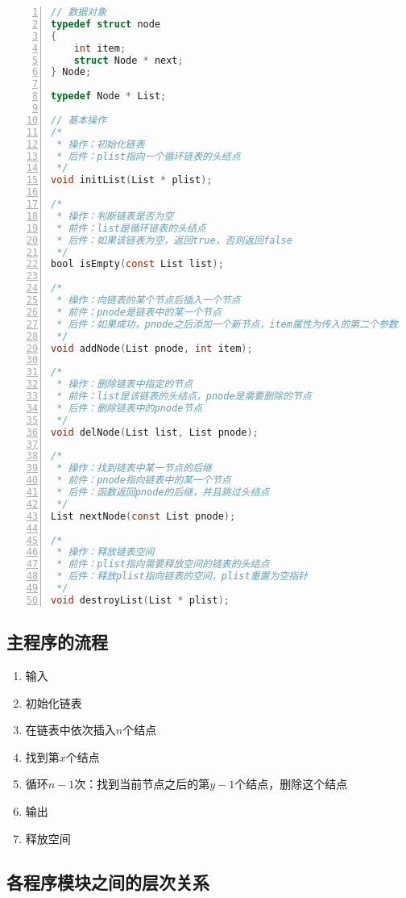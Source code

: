 \documentclass{article}
\begin{document}
\begin{lstlisting}[language={C},
    numbers=left,
    numberstyle=\tiny\menlo,
    basicstyle=\small\menlo]
// 数据对象
typedef struct node
{
    int item;
    struct Node * next;
} Node;

typedef Node * List;

// 基本操作
/*
 * 操作：初始化链表
 * 后件：plist指向一个循环链表的头结点
 */
void initList(List * plist);

/*
 * 操作：判断链表是否为空
 * 前件：list是循环链表的头结点
 * 后件：如果该链表为空，返回true，否则返回false
 */
bool isEmpty(const List list);

/*
 * 操作：向链表的某个节点后插入一个节点
 * 前件：pnode是链表中的某一个节点
 * 后件：如果成功，pnode之后添加一个新节点，item属性为传入的第二个参数
 */
void addNode(List pnode, int item);

/*
 * 操作：删除链表中指定的节点
 * 前件：list是该链表的头结点，pnode是需要删除的节点
 * 后件：删除链表中的pnode节点
 */
void delNode(List list, List pnode);

/*
 * 操作：找到链表中某一节点的后继
 * 前件：pnode指向链表中的某一个节点
 * 后件：函数返回pnode的后继，并且跳过头结点
 */
List nextNode(const List pnode);

/*
 * 操作：释放链表空间
 * 前件：plist指向需要释放空间的链表的头结点
 * 后件：释放plist指向链表的空间，plist重置为空指针
 */
void destroyList(List * plist);
\end{lstlisting}

\subsection{主程序的流程}

\begin{enumerate}
    \item 输入
    \item 初始化链表
    \item 在链表中依次插入$n$个结点
    \item 找到第$x$个结点
    \item 循环$n-1$次：找到当前节点之后的第$y-1$个结点，删除这个结点
    \item 输出
    \item 释放空间
\end{enumerate}

\subsection{各程序模块之间的层次关系}
\end{document}
